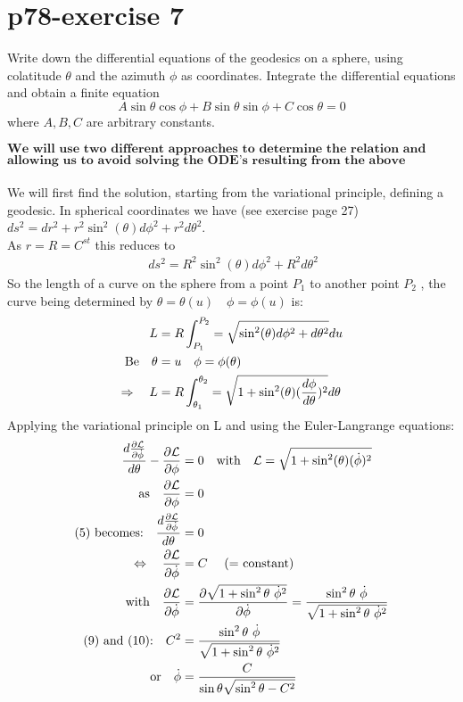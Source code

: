 \section{p78-exercise 7}
\begin{tcolorbox}
Write down the differential equations of the geodesics on a sphere, using colatitude $\theta$ and the azimuth $\phi$ as coordinates. Integrate the differential equations and obtain a finite equation $$ A\sin \theta \cos \phi + B \sin \theta \sin \phi + C\cos\theta = 0$$
where $A,B,C$ are arbitrary constants.
\end{tcolorbox}
$$\textbf{We will use two different approaches to determine the relation and finally use a geometrical reasoning }$$ $$\textbf{allowing us to avoid solving the ODE's resulting from the above mentioned approaches.}$$\\
We will first find the solution, starting from the variational principle, defining a geodesic.
In spherical coordinates we have (see exercise page 27) $ds^2 = dr^2 +  r^2\sin^2(\theta)d\phi^2+ r^2d\theta^2$.\\
As $r=R= C^{st}$ this reduces to
\begin{align}
\ ds^2 = R^2\sin^2(\theta)d\phi^2+ R^2d\theta^2
\end{align}
So the length of a curve on the sphere from a point $P_1$ to another point $P_2$ , the curve being determined by $\theta = \theta(u)\quad \phi = \phi(u)$ is:\\
\begin{align}
\ L &= R\int_{P_1}^{P_2} = \sqrt{\sin^2(\theta)d\phi^2+ d\theta^2}du\\
\text{Be}\quad \theta &= u \quad \phi = \phi(\theta)\\
\Rightarrow \quad  L &= R\int_{\theta_1}^{\theta_2} = \sqrt{1+\sin^2(\theta)(\dv{\phi}{\theta})^2}d\theta
\end{align}
Applying the variational principle on L and using the Euler-Langrange equations:
\begin{align}
 \dv{\pdv{\mathcal{L}}{\dot{\phi}}}{\theta} - \pdv{\mathcal{L}}{\phi}&=0 \quad 
 \text{with}\quad \mathcal{L} = \sqrt{1+\sin^2(\theta)(\dot{\phi})^2}\\
 \text{as}\quad  \pdv{\mathcal{L}}{\phi}&=0\\
 \text{(5) becomes:} \quad \dv{\pdv{\mathcal{L}}{\dot{\phi}}}{\theta} &=0\\
 \Leftrightarrow \quad \pdv{\mathcal{L}}{\dot{\phi}} &= C\quad \ \text{(= constant)}\\
\text{with}\quad \pdv{\mathcal{L}}{\dot{\phi}} &= \pdv{\sqrt{1+\sin^2 \theta   \  \dot{\phi}^2 }}{\dot{\phi}}= \frac{\sin^2 \theta \  \dot{\phi}}{ \sqrt{1+\sin^2 \theta \ \dot{\phi}^2 }}\\
\text{(9) and (10):}\quad C^2 &= \frac{\sin^2 \theta \  \dot{\phi}}{ \sqrt{1+\sin^2 \theta \ \dot{\phi}^2 }} \\
\text{or}\quad \dot{\phi} &= \frac{C}{\sin \theta \sqrt{\sin^2 \theta - C^2}}
\end{align}
